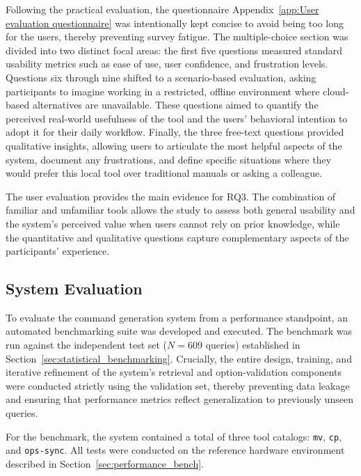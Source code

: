 Following the practical evaluation, the questionnaire Appendix~\ref{app:User evaluation questionnaire} was intentionally kept concise to avoid being too long for the users, thereby preventing survey fatigue. The multiple-choice section was divided into two distinct focal areas: the first five questions measured standard usability metrics such as ease of use, user confidence, and frustration levels. Questions six through nine shifted to a scenario-based evaluation, asking participants to imagine working in a restricted, offline environment where cloud-based alternatives are unavailable. These questions aimed to quantify the perceived real-world usefulness of the tool and the users' behavioral intention to adopt it for their daily workflow. Finally, the three free-text questions provided qualitative insights, allowing users to articulate the most helpful aspects of the system, document any frustrations, and define specific situations where they would prefer this local tool over traditional manuals or asking a colleague.

The user evaluation provides the main evidence for RQ3. The combination of familiar and unfamiliar tools allows the study to assess both general usability and the system’s perceived value when users cannot rely on prior knowledge, while the quantitative and qualitative questions capture complementary aspects of the participants’ experience.

\subsection{System Evaluation}
\label{sec:technical_benchmarking_methodology}

To evaluate the command generation system from a performance standpoint, an automated benchmarking suite was developed and executed. The benchmark was run against the independent test set ($N=609$ queries) established in Section~\ref{sec:statistical_benchmarking}. Crucially, the entire design, training, and iterative refinement of the system's retrieval and option-validation components were conducted strictly using the validation set, thereby preventing data leakage and ensuring that performance metrics reflect generalization to previously unseen queries.

For the benchmark, the system contained a total of three tool catalogs: \texttt{mv}, \texttt{cp}, and \texttt{ops-sync}. All tests were conducted on the reference hardware environment described in Section~\ref{sec:performance_bench}.


